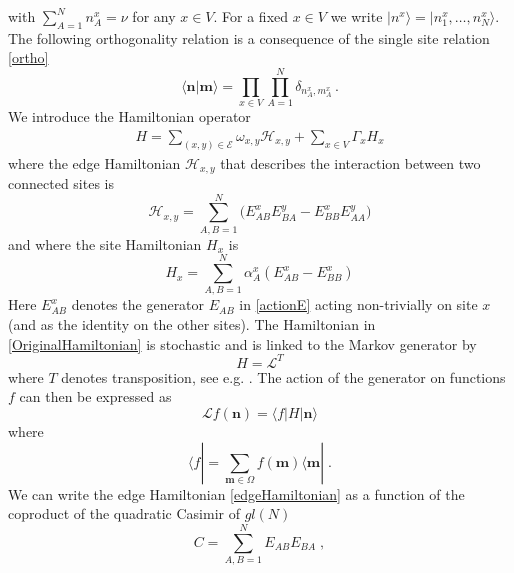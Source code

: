 \documentclass[10pt]{article}
\numberwithin{equation}{section}
\numberwithin{equation}{subsection}
\newcommand{\co}{\;,}
\newcommand{\dt}{\;.}
\begin{document}
with $\sum_{A=1}^{N}n_{A}^{x}=\nu$ for any $x\in V$. For a fixed $x\in V$ we write $|n^{x}\rangle=|n_{1}^{x},\ldots,n_{N}^{x}\rangle$. The following orthogonality relation is a consequence of the single site relation \eqref{ortho}
\begin{equation}
    \langle {\bm{n}}|{\bm{m}}\rangle =\prod_{x\in V}\prod_{A=1}^N\delta_{n^x_{A},m^{x}_{A}}\,.
\end{equation}
We introduce the Hamiltonian operator
\begin{equation}\label{OriginalHamiltonian}
	\begin{split}
		H=\sum_{(x,y)\in \mathcal{E}}\omega_{x,y}\mathcal{H}_{x,y}+\sum_{x\in V}\Gamma_{x}H_{x}
	\end{split}
\end{equation}
where the edge Hamiltonian $\mathcal{H}_{x,y}$ that describes the interaction between two connected sites is
\begin{equation}\label{edgeHamiltonian}
\mathcal{H}_{x,y}=\sum_{A,B=1}^{N}\Big(E_{AB}^{x} E_{BA}^{y}-E_{BB}^{x} E_{AA}^{y}\Big)
 \end{equation}
  and where the site Hamiltonian $H_{x}$  is
 \begin{equation}\label{siteHamiltonian}
H_{x}=\sum_{A,B=1}^{N}\alpha_{A}^{x}\left(E_{AB}^{x}-E_{BB}^{x}\right)
\end{equation}
Here $E_{AB}^{x}$ denotes the generator $E_{AB}$ in \eqref{actionE} acting non-trivially on site $x$ (and as the identity on the other sites). 
The Hamiltonian in \eqref{OriginalHamiltonian} is stochastic and is linked to the Markov generator  by
\begin{equation}\label{Hamiltonian-Generator}
H=\mathcal{L}^{T} 
\end{equation}
where $T$ denotes transposition, see e.g.  \cite{belitsky2015self}.
The action of the generator on functions $f$ can then  be expressed as 
\begin{equation}
    \mathcal{L}f( {\bm{n}})=\langle f|H| {\bm{n}}\rangle
\end{equation}
where 
\begin{equation}
    \langle f|=\sum_{ {{\bm{m}}\in \Omega}}f( {\bm{m}})\langle  {\bm{m}}|\dt
\end{equation}
We can write the edge Hamiltonian \eqref{edgeHamiltonian} as a function of the coproduct of the quadratic Casimir of ${gl}(N)$
\begin{equation}\label{secondCasimir}
    C=\sum_{A,B=1}^{N}E_{AB}E_{BA}\co
\end{equation}
\end{document}
